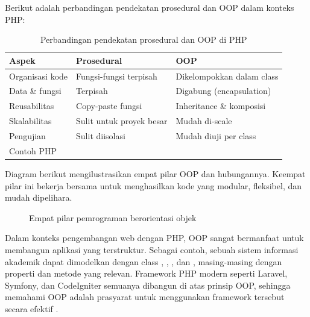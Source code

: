 Berikut adalah perbandingan pendekatan prosedural dan OOP dalam konteks PHP:

\begin{table}[H]
\centering
\begin{tabular}{|P{3cm}|P{5cm}|P{5cm}|}
\hline
\textbf{Aspek} & \textbf{Prosedural} & \textbf{OOP} \\
\hline
Organisasi kode & Fungsi-fungsi terpisah & Dikelompokkan dalam class \\
\hline
Data \& fungsi & Terpisah & Digabung (encapsulation) \\
\hline
Reusabilitas & Copy-paste fungsi & Inheritance \& komposisi \\
\hline
Skalabilitas & Sulit untuk proyek besar & Mudah di-scale \\
\hline
Pengujian & Sulit diisolasi & Mudah diuji per class \\
\hline
Contoh PHP &  &  \\
\hline
\end{tabular}
\caption{Perbandingan pendekatan prosedural dan OOP di PHP}
\end{table}

Diagram berikut mengilustrasikan empat pilar OOP dan hubungannya. Keempat pilar ini bekerja bersama untuk menghasilkan kode yang modular, fleksibel, dan mudah dipelihara.

\begin{figure}[H]
\centering
{}
\caption{Empat pilar pemrograman berorientasi objek}
\end{figure}

Dalam konteks pengembangan web dengan PHP, OOP sangat bermanfaat untuk membangun aplikasi yang terstruktur. Sebagai contoh, sebuah sistem informasi akademik dapat dimodelkan dengan class , , , dan , masing-masing dengan properti dan metode yang relevan. Framework PHP modern seperti Laravel, Symfony, dan CodeIgniter semuanya dibangun di atas prinsip OOP, sehingga memahami OOP adalah prasyarat untuk menggunakan framework tersebut secara efektif \cite{phpRightWay}.

